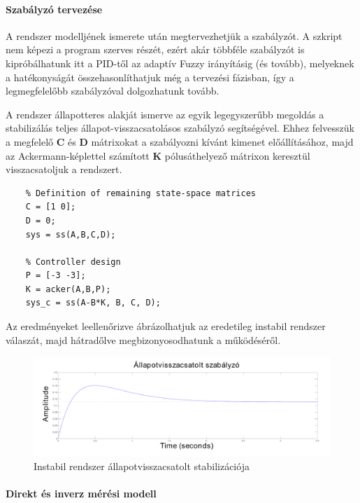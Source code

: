 \paragraph{Szabályzó tervezése}

A rendszer modelljének ismerete után megtervezhetjük a szabályzót. A szkript nem képezi a program szerves részét, ezért akár többféle szabályzót is kipróbálhatunk itt a PID-től az adaptív Fuzzy irányításig (és tovább), melyeknek a hatékonyságát összehasonlíthatjuk még a tervezési fázisban, így a legmegfelelőbb szabályzóval dolgozhatunk tovább.

A rendszer állapotteres alakját ismerve az egyik legegyszerűbb megoldás a stabilizálás teljes állapot-visszacsatolásos szabályzó segítségével. Ehhez felvesszük a megfelelő \textbf{C} és \textbf{D} mátrixokat a szabályozni kívánt kimenet előállításához, majd az Ackermann-képlettel számított \textbf{K} pólusáthelyező mátrixon keresztül visszacsatoljuk a rendszert.

\begin{lstlisting}
    % Definition of remaining state-space matrices
    C = [1 0];
    D = 0;
    sys = ss(A,B,C,D);
    
    % Controller design
    P = [-3 -3];
    K = acker(A,B,P);
    sys_c = ss(A-B*K, B, C, D);
\end{lstlisting}

Az eredményeket leellenőrizve ábrázolhatjuk az eredetileg instabil rendszer válaszát, majd hátradőlve megbizonyosodhatunk a működéséről.

\begin{figure}[!ht]
    \centering
    \includegraphics[width=\linewidth]{img/plot2}
    \caption{Instabil rendszer állapotvisszacsatolt stabilizációja}
    \label{fig:plot2}
\end{figure}

\paragraph{Direkt és inverz mérési modell}

